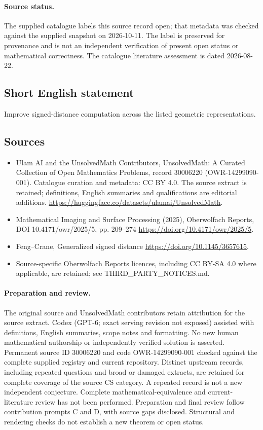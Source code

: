 \documentclass[11pt]{article}
\begin{document}
\paragraph{Source status.}
The supplied catalogue labels this source record open; that metadata was checked against the supplied snapshot on 2026-10-11. The label is preserved for provenance and is not an independent verification of present open status or mathematical correctness. The catalogue literature assessment is dated 2026-08-22.
\subsection{Short English statement}
Improve signed-distance computation across the listed geometric representations.
\subsection{Sources}
\begin{itemize}
\item[S1] Ulam AI and the UnsolvedMath Contributors, UnsolvedMath: A Curated Collection of Open Mathematics Problems, record 30006220 (OWR-14299090-001). Catalogue curation and metadata: CC BY 4.0. The source extract is retained; definitions, English summaries and qualifications are editorial additions.
\url{https://huggingface.co/datasets/ulamai/UnsolvedMath}.
\item[S2] Mathematical Imaging and Surface Processing (2025), Oberwolfach Reports, DOI 10.4171/owr/2025/5, pp. 209--274
\url{https://doi.org/10.4171/owr/2025/5}.
\item[S3] Feng--Crane, Generalized signed distance
\url{https://doi.org/10.1145/3657615}.
\item Source-specific Oberwolfach Reports licences, including CC BY-SA 4.0 where applicable, are retained; see THIRD\_PARTY\_NOTICES.md.
\end{itemize}
\paragraph{Preparation and review.}
The original source and UnsolvedMath contributors retain attribution for the source extract. Codex (GPT-6; exact serving revision not exposed) assisted with definitions, English summaries, scope notes and formatting. No new human mathematical authorship or independently verified solution is asserted. Permanent source ID 30006220 and code OWR-14299090-001 checked against the complete supplied registry and current repository. Distinct upstream records, including repeated questions and broad or damaged extracts, are retained for complete coverage of the source CS category. A repeated record is not a new independent conjecture. Complete mathematical-equivalence and current-literature review has not been performed. Preparation and final review follow contribution prompts C and D, with source gaps disclosed. Structural and rendering checks do not establish a new theorem or open status.
\label{end:30006220}
\end{document}
